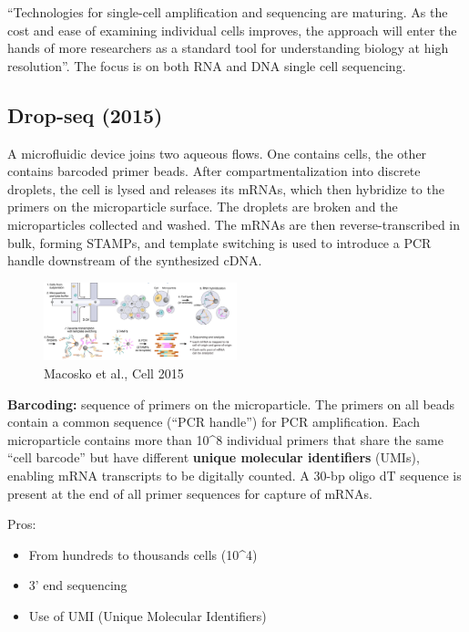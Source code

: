 ``Technologies for single-cell amplification and sequencing are
maturing. As the cost and ease of examining individual cells improves,
the approach will enter the hands of more researchers as a standard tool
for understanding biology at high resolution''. The focus is on both RNA
and DNA single cell sequencing.

\hypertarget{drop-seq-2015}{%
\subsection{Drop-seq (2015)}\label{drop-seq-2015}}

A microfluidic device joins two aqueous flows. One contains cells, the
other contains barcoded primer beads. After compartmentalization into
discrete droplets, the cell is lysed and releases its mRNAs, which then
hybridize to the primers on the microparticle surface. The droplets are
broken and the microparticles collected and washed. The mRNAs are then
reverse-transcribed in bulk, forming STAMPs, and template switching is
used to introduce a PCR handle downstream of the synthesized cDNA.

\begin{figure}
\centering
\includegraphics[width=0.5\textwidth]{images/Screen_Shot_2023-02-21_at_19-51-12.png}
\caption{Macosko et al., Cell 2015}
\end{figure}

\textbf{Barcoding:} sequence of primers on the microparticle. The
primers on all beads contain a common sequence (``PCR handle'') for PCR
amplification. Each microparticle contains more than 10\^{}8 individual
primers that share the same ``cell barcode'' but have different
\textbf{unique molecular identifiers} (UMIs), enabling mRNA transcripts
to be digitally counted. A 30-bp oligo dT sequence is present at the end
of all primer sequences for capture of mRNAs.

Pros:

\begin{itemize}
\tightlist
\item
  From hundreds to thousands cells (10\^{}4)
\item
  3' end sequencing
\item
  Use of UMI (Unique Molecular Identifiers)
\end{itemize}

